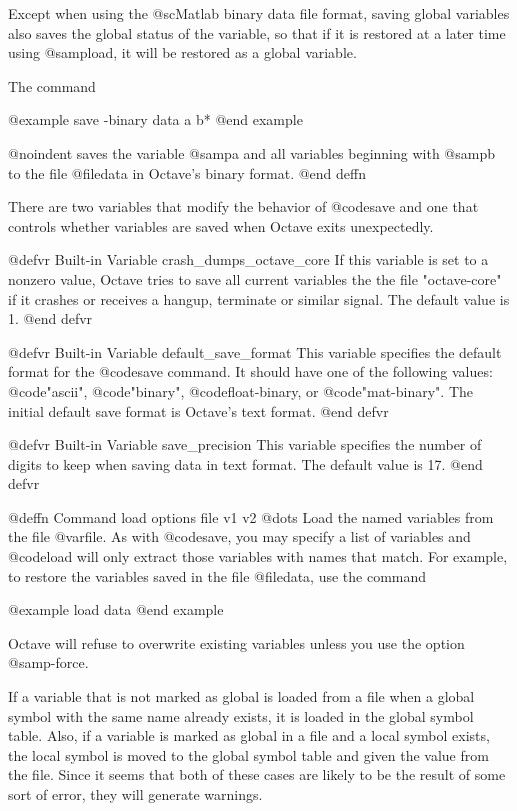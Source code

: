 Except when using the @sc{Matlab} binary data file format, saving global
variables also saves the global status of the variable, so that if it is
restored at a later time using @samp{load}, it will be restored as a
global variable.

The command

@example
save -binary data a b*
@end example

@noindent
saves the variable @samp{a} and all variables beginning with @samp{b} to
the file @file{data} in Octave's binary format.
@end deffn

There are two variables that modify the behavior of @code{save} and one
that controls whether variables are saved when Octave exits unexpectedly.

@defvr {Built-in Variable} crash_dumps_octave_core
If this variable is set to a nonzero value, Octave tries to save all
current variables the the file "octave-core" if it crashes or receives a
hangup, terminate or similar signal.  The default value is 1.
@end defvr

@defvr {Built-in Variable} default_save_format
This variable specifies the default format for the @code{save} command.
It should have one of the following values: @code{"ascii"},
@code{"binary"}, @code{float-binary}, or @code{"mat-binary"}.  The
initial default save format is Octave's text format.
@end defvr

@defvr {Built-in Variable} save_precision
This variable specifies the number of digits to keep when saving data in
text format.  The default value is 17.
@end defvr

@deffn {Command} load options file v1 v2 @dots{}
Load the named variables from the file @var{file}.  As with @code{save},
you may specify a list of variables and @code{load} will only extract
those variables with names that match.  For example, to restore the
variables saved in the file @file{data}, use the command

@example
load data
@end example

Octave will refuse to overwrite existing variables unless you use the
option @samp{-force}.

If a variable that is not marked as global is loaded from a file when a
global symbol with the same name already exists, it is loaded in the
global symbol table.  Also, if a variable is marked as global in a file
and a local symbol exists, the local symbol is moved to the global
symbol table and given the value from the file.  Since it seems that
both of these cases are likely to be the result of some sort of error,
they will generate warnings.

